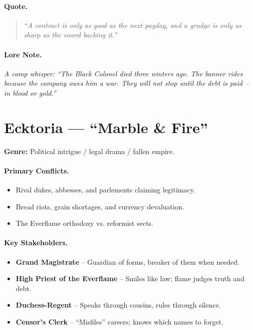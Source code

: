 \paragraph{Quote.}
\begin{quote}
\emph{“A contract is only as good as the next payday, and a grudge is only as sharp as the sword backing it.”}
\end{quote}

\paragraph{Lore Note.}
\emph{A camp whisper: “The Black Colonel died three winters ago. The banner rides because the company owes him a war. They will not stop until the debt is paid – in blood or gold.”}

\section{Ecktoria — “Marble \& Fire”}
\textbf{Genre:} Political intrigue / legal drama / fallen empire.

\paragraph{Primary Conflicts.}
\begin{itemize}
  \item Rival dukes, abbesses, and parlements claiming legitimacy.
  \item Bread riots, grain shortages, and currency devaluation.
  \item The Everflame orthodoxy vs. reformist sects.
\end{itemize}

\paragraph{Key Stakeholders.}
\begin{itemize}
  \item \textbf{Grand Magistrate} – Guardian of forms, breaker of them when needed.
  \item \textbf{High Priest of the Everflame} – Smiles like law; flame judges truth and debt.
  \item \textbf{Duchess-Regent} – Speaks through cousins, rules through silence.
  \item \textbf{Censor’s Clerk} – “Misfiles” careers; knows which names to forget.
\end{itemize}


